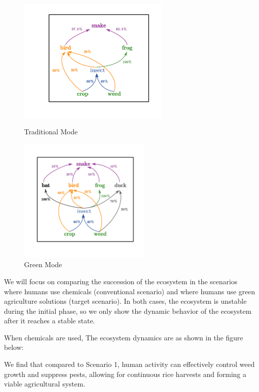 \documentclass{HZNUMCM}
\begin{document}
        \begin{figure}[H]
          \begin{minipage}[b]{0.45\linewidth}
            \centering
            \includegraphics[height=6cm, keepaspectratio]{images/food_web_chem.pdf}
            \caption{Traditional Mode}
            \label{fig:food_web_chem}
          \end{minipage}
          \hspace{0.05\linewidth}
          \begin{minipage}[b]{0.45\linewidth}
              \centering
              \includegraphics[height=6cm, keepaspectratio]{images/food_web.pdf} %
              \caption{Green Mode}
              \label{fig:food_web_green}
          \end{minipage}
        \end{figure}
        We will focus on comparing the succession of the ecosystem in the scenarios where humans use chemicals 
        (conventional scenario) and where humans use green agriculture solutions (target scenario). 
        In both cases, the ecosystem is unstable during the initial phase, 
        so we only show the dynamic behavior of the ecosystem after it reaches a stable state.

        When chemicals are used, 
        The ecosystem dynamics are as shown in the figure below:
        \begin{figure}[H]
        \end{figure}
        We find that compared to Scenario 1, human activity can effectively control weed growth and suppress pests, 
        allowing for continuous rice harvests and forming a viable agricultural system.
\end{document}
